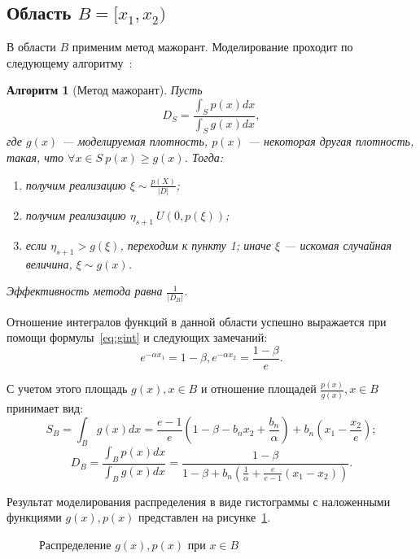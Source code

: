 \documentclass[12pt, specialist, subf, substylefile = spbu.rtx]{disser}
\newtheorem{algo}{Алгоритм}
\begin{document}

\subsection{Область $B=[x_1, x_2)$}

В области $B$ применим метод мажорант. Моделирование проходит по следующему алгоритму~\cite{MonErm}:
\begin{algo}[Метод мажорант]
Пусть 
$$D_S=\frac{\int_S p(x) dx}{\int_S g(x) dx},$$
где $g(x)$ --- моделируемая плотность, $p(x)$ --- некоторая другая плотность, такая, что $\forall x \in S \ p(x) \ge g(x)$. Тогда:
\begin{enumerate}
\item получим реализацию $\xi \sim \frac{p(X)}{|D|}$;
\item получим реализацию $\eta_{s+1} ~U(0, p(\xi))$;
\item если $\eta_{s+1} > g(\xi)$, переходим к пункту 1; иначе $\xi$ --- искомая случайная величина, $\xi \sim g(x)$.
\end{enumerate}
Эффективность метода равна $\frac{1}{|D_B|}$.
\end{algo}

Отношение интегралов функций в данной области успешно выражается при помощи формулы~\eqref{eq:gint} и следующих замечаний:
\begin{equation}\label{eq:ex1x2}
e^{-\alpha x_1}=1-\beta, e^{-\alpha x_2}=\frac{1-\beta}{e}.
\end{equation}

С учетом этого площадь $g(x), x \in B$ и отношение площадей $\frac{p(x)}{g(x)}, x \in B$ принимает вид: 
$$
S_B=\int_B g(x)dx=\frac{e-1}{e}(1-\beta-b_nx_2+\frac{b_n}{\alpha})+b_n(x_1-\frac{x_2}{e});
$$
$$
D_B=\frac{\int_B p(x)dx}{\int_B g(x) dx}= \frac{1-\beta}{1-\beta+b_n(\frac{1}{\alpha}+\frac{e}{e-1}(x_1-x_2))}.
$$

Результат моделирования распределения в виде гистограммы с наложенными функциями $g(x), p(x)$ представлен на рисунке~\ref{ris:sectionB}. 

\begin{figure}[h]
\caption{Распределение $g(x), p(x)$ при $x \in B$}
\label{ris:sectionB}
\end{figure}
\end{document}
